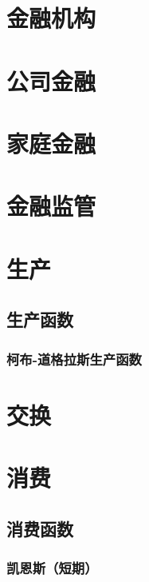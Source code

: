 \documentclass[12pt]{book}
\begin{document}
\chapter{金融机构}




\chapter{公司金融}




\chapter{家庭金融}


 






\chapter{金融监管}




\chapter{生产}


\section{生产函数}


\subsection{柯布-道格拉斯生产函数}


\chapter{交换}


\chapter{消费}

\section{消费函数}


\subsection{凯恩斯（短期）}
\end{document}
